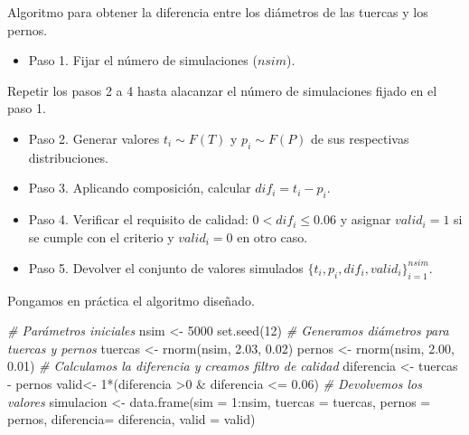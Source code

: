 \documentclass[
]{book}
\newenvironment{Shaded}{\begin{snugshade}}{\end{snugshade}}
\newcommand{\AttributeTok}[1]{\textcolor[rgb]{0.77,0.63,0.00}{#1}}
\newcommand{\CommentTok}[1]{\textcolor[rgb]{0.56,0.35,0.01}{\textit{#1}}}
\newcommand{\DecValTok}[1]{\textcolor[rgb]{0.00,0.00,0.81}{#1}}
\newcommand{\FloatTok}[1]{\textcolor[rgb]{0.00,0.00,0.81}{#1}}
\newcommand{\FunctionTok}[1]{\textcolor[rgb]{0.00,0.00,0.00}{#1}}
\newcommand{\NormalTok}[1]{#1}
\newcommand{\OtherTok}[1]{\textcolor[rgb]{0.56,0.35,0.01}{#1}}
\newcommand{\SpecialCharTok}[1]{\textcolor[rgb]{0.00,0.00,0.00}{#1}}
\providecommand{\tightlist}{%
  \setlength{\itemsep}{0pt}\setlength{\parskip}{0pt}}
\newenvironment{silverbox}{
  \definecolor{shadecolor}{rgb}{192, 192, 192}  
  \color{black}
  \begin{shaded}}
 {\end{shaded}}
\theoremstyle{definition}
\theoremstyle{definition}
\theoremstyle{definition}
\theoremstyle{definition}
\theoremstyle{remark}
\begin{document}
\begin{silverbox}

Algoritmo para obtener la diferencia entre los diámetros de las tuercas y los pernos.

\begin{itemize}
\tightlist
\item
  Paso 1. Fijar el número de simulaciones (\(nsim\)).
\end{itemize}

Repetir los pasos 2 a 4 hasta alacanzar el número de simulaciones fijado en el paso 1.

\begin{itemize}
\tightlist
\item
  Paso 2. Generar valores \(t_i\sim F(T)\) y \(p_i \sim F(P)\) de sus respectivas distribuciones.
\item
  Paso 3. Aplicando composición, calcular \(dif_i = t_i - p_i.\)
\item
  Paso 4. Verificar el requisito de calidad: \(0 < dif_i \leq 0.06\) y asignar \(valid_i = 1\) si se cumple con el criterio y \(valid_i = 0\) en otro caso.
\item
  Paso 5. Devolver el conjunto de valores simulados \(\{t_i, p_i, dif_i, valid_i\}_{i=1}^{nsim}.\)
\end{itemize}

\end{silverbox}

Pongamos en práctica el algoritmo diseñado.

\begin{Shaded}
\begin{Highlighting}[]
\CommentTok{\# Parámetros iniciales}
\NormalTok{nsim }\OtherTok{\textless{}{-}} \DecValTok{5000}
\FunctionTok{set.seed}\NormalTok{(}\DecValTok{12}\NormalTok{)}
\CommentTok{\# Generamos diámetros para tuercas y pernos}
\NormalTok{tuercas }\OtherTok{\textless{}{-}} \FunctionTok{rnorm}\NormalTok{(nsim, }\FloatTok{2.03}\NormalTok{, }\FloatTok{0.02}\NormalTok{)}
\NormalTok{pernos }\OtherTok{\textless{}{-}} \FunctionTok{rnorm}\NormalTok{(nsim, }\FloatTok{2.00}\NormalTok{, }\FloatTok{0.01}\NormalTok{)}
\CommentTok{\# Calculamos la diferencia y creamos filtro de calidad}
\NormalTok{diferencia }\OtherTok{\textless{}{-}}\NormalTok{ tuercas }\SpecialCharTok{{-}}\NormalTok{ pernos}
\NormalTok{valid}\OtherTok{\textless{}{-}} \DecValTok{1}\SpecialCharTok{*}\NormalTok{(diferencia }\SpecialCharTok{\textgreater{}}\DecValTok{0} \SpecialCharTok{\&}\NormalTok{ diferencia }\SpecialCharTok{\textless{}=} \FloatTok{0.06}\NormalTok{)}
\CommentTok{\# Devolvemos los valores }
\NormalTok{simulacion }\OtherTok{\textless{}{-}} \FunctionTok{data.frame}\NormalTok{(}\AttributeTok{sim =} \DecValTok{1}\SpecialCharTok{:}\NormalTok{nsim, }
                         \AttributeTok{tuercas =}\NormalTok{ tuercas, }
                         \AttributeTok{pernos =}\NormalTok{ pernos, }
                         \AttributeTok{diferencia=}\NormalTok{ diferencia, }
                         \AttributeTok{valid =}\NormalTok{ valid)}
\end{Highlighting}
\end{Shaded}
\end{document}
